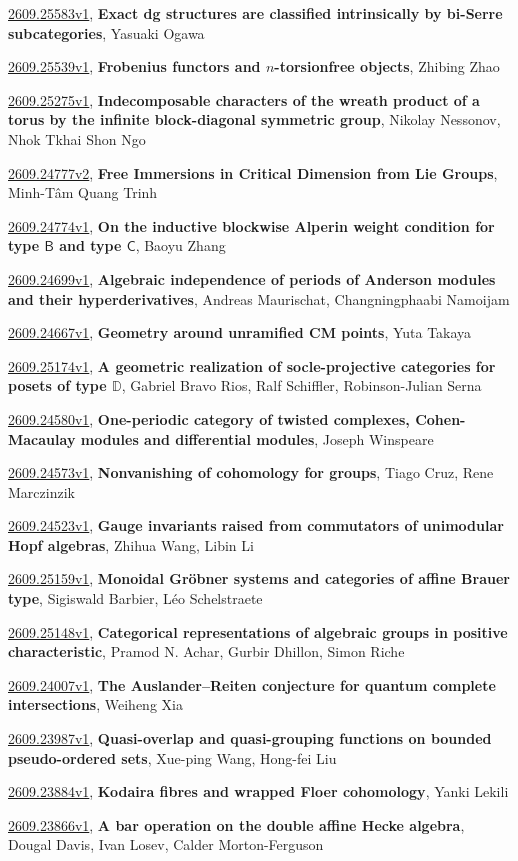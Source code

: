 \documentclass[9pt, a4paper]{article}
\theoremstyle{plain}
\theoremstyle{definition}
\theoremstyle{remark}
\newcommand{\arxiv}[3]{\href{https://arxiv.org/abs/#1}{#1}, \textbf{\textcolor{arxivblue}{#2}}, #3}
\begin{document}
\arxiv{2609.25583v1}{Exact dg structures are classified intrinsically by bi-Serre subcategories}{Yasuaki Ogawa}

\arxiv{2609.25539v1}{Frobenius functors and $n$-torsionfree objects}{Zhibing Zhao}

\arxiv{2609.25275v1}{Indecomposable characters of the wreath product of a torus by the infinite block-diagonal symmetric group}{Nikolay Nessonov, Nhok Tkhai Shon Ngo}

\arxiv{2609.24777v2}{Free Immersions in Critical Dimension from Lie Groups}{Minh-Tâm Quang Trinh}

\arxiv{2609.24774v1}{On the inductive blockwise Alperin weight condition for type $\mathsf B$ and type $\mathsf C$}{Baoyu Zhang}

\arxiv{2609.24699v1}{Algebraic independence of periods of Anderson modules and their hyperderivatives}{Andreas Maurischat, Changningphaabi Namoijam}

\arxiv{2609.24667v1}{Geometry around unramified CM points}{Yuta Takaya}

\arxiv{2609.25174v1}{A geometric realization of socle-projective categories for posets of type $\mathbb{D}$}{Gabriel Bravo Rios, Ralf Schiffler, Robinson-Julian Serna}

\arxiv{2609.24580v1}{One-periodic category of twisted complexes, Cohen-Macaulay modules and differential modules}{Joseph Winspeare}

\arxiv{2609.24573v1}{Nonvanishing of cohomology for groups}{Tiago Cruz, Rene Marczinzik}

\arxiv{2609.24523v1}{Gauge invariants raised from commutators of unimodular Hopf algebras}{Zhihua Wang, Libin Li}

\arxiv{2609.25159v1}{Monoidal Gröbner systems and categories of affine Brauer type}{Sigiswald Barbier, Léo Schelstraete}

\arxiv{2609.25148v1}{Categorical representations of algebraic groups in positive characteristic}{Pramod N. Achar, Gurbir Dhillon, Simon Riche}

\arxiv{2609.24007v1}{The Auslander--Reiten conjecture for quantum complete intersections}{Weiheng Xia}

\arxiv{2609.23987v1}{Quasi-overlap and quasi-grouping functions on bounded pseudo-ordered sets}{Xue-ping Wang, Hong-fei Liu}

\arxiv{2609.23884v1}{Kodaira fibres and wrapped Floer cohomology}{Yanki Lekili}

\arxiv{2609.23866v1}{A bar operation on the double affine Hecke algebra}{Dougal Davis, Ivan Losev, Calder Morton-Ferguson}
\end{document}
